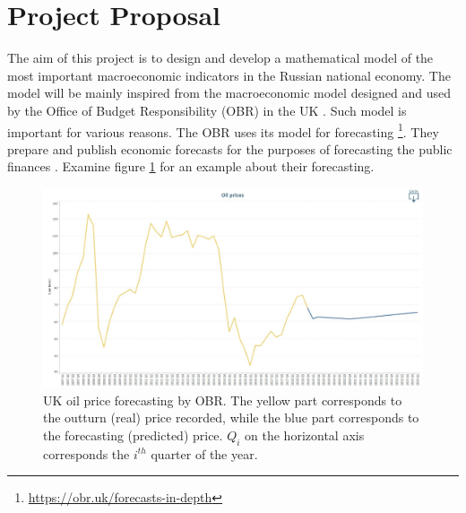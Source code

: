 

\section{Project Proposal}
The aim of this project is to design and develop a mathematical model of the most important macroeconomic indicators in the Russian national economy.
The model will be mainly inspired from the macroeconomic model designed and used by the Office of Budget Responsibility (OBR) in the UK \parencite{obr}.
Such model is important for various reasons.
The OBR uses its model for forecasting%
\footnote{\url{https://obr.uk/forecasts-in-depth}}.
They prepare and publish economic forecasts for the purposes of forecasting the public finances \parencite{obr2}.
Examine figure \ref{img:oil-prices} for an example about their forecasting.

\begin{figure}[!htb]
\centering
\includegraphics[width=1\textwidth]{images/oil-prices.jpg}
\caption{
UK oil price forecasting by OBR\protect\footnotemark.
The yellow part corresponds to the outturn (real) price recorded,
while the blue part corresponds to the forecasting (predicted) price.
$Q_i$ on the horizontal axis corresponds the $i^{th}$ quarter of the year.
}
\label{img:oil-prices}
\end{figure}



